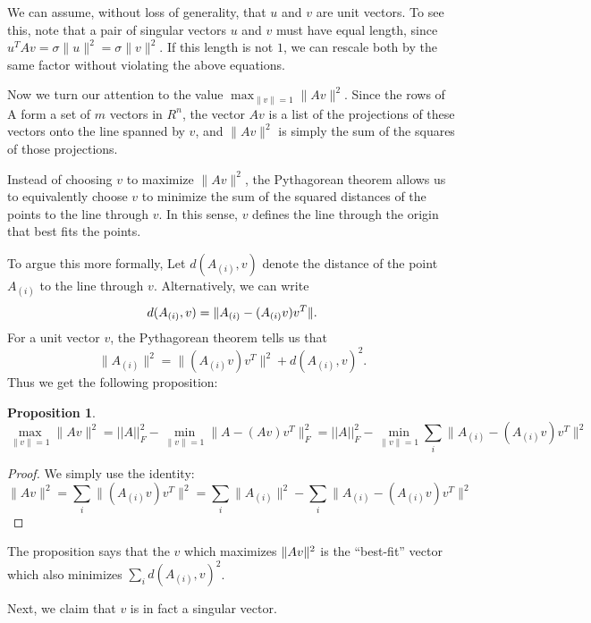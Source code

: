\documentclass{book}
\newtheorem{proposition}[theorem]{Proposition}
\numberwithin{exercise}{chapter}
\begin{document}
We can assume, without loss of generality, that $u$ and $v$ are unit
vectors. To see this, note that a pair of singular vectors $u$ and $v$
must have equal length, since $u^TAv = \sigma \|u\|^2 = \sigma \|v\|^2$.
If this length is not $1$, we can rescale both by the same
factor without violating the above equations.

Now we turn our attention to the value $\max_{\|v\| = 1}\|Av\|^2$.
Since the rows of A form a set of $m$ vectors in $R^n$, the vector $Av$
is a list of the projections of these vectors onto the line spanned by
$v$, and $\|Av\|^2$ is simply the sum of the squares of those
projections.

Instead of choosing $v$ to maximize $\|Av\|^2$, the Pythagorean
theorem allows us to equivalently choose $v$ to minimize the sum of
the squared distances of the points to the line through $v$.  In this
sense, $v$ defines the line through the origin that best fits the
points.


To argue this more formally,
Let $d(A_{(i)},v)$ denote the distance of the point
$A_{(i)}$ to the line through $v$.  Alternatively, we can write
\[
d(A_{(i)},v) = \|A_{(i)} - (A_{(i)}v)v^T\|.
\]
For a unit vector $v$, the Pythagorean theorem tells us that
\[
\|A_{(i)}\|^2 = \|(A_{(i)}v)v^T\|^2 + d(A_{(i)},v)^2.
\]
Thus we get the following proposition:

\begin{proposition}
$$\max_{\|v\| = 1}\|Av\|^2 = ||A||_F^2-\min_{\|v\| = 1}\|A -
(Av)v^T\|_F^2 = ||A||_F^2- \min_{\|v\| = 1} \sum_{i}\|A_{(i)} -
(A_{(i)}v)v^T\|^2 $$
\end{proposition}

\begin{proof}
We simply use the identity:
$$\|Av\|^2 = \sum_i \|(A_{(i)}v)v^T\|^2 = \sum_i \|A_{(i)}\|^2 - \sum_{i}\|A_{(i)} - (A_{(i)}v)v^T\|^2 $$
\end{proof}

The proposition says that the $v$ which maximizes $\|Av\|^2$ is the
``best-fit'' vector which also minimizes $\sum_i d(A_{(i)},v)^2$.

Next, we claim that $v$ is in fact a singular vector.
\end{document}

